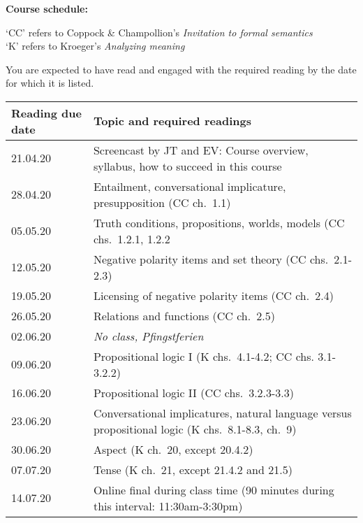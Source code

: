 \documentclass[11pt,fleqn,a4]{article}
\newcommand{\6}{\mbox{$[\hspace*{-.6mm}[$}}
\newcommand{\9}{\mbox{$]\hspace*{-.6mm}]$}}
\begin{document}
{\bf Course schedule:} 

`CC' refers to Coppock \& Champollion's {\em Invitation to formal semantics}
\\
`K' refers to Kroeger's {\em Analyzing meaning}

You are expected to have read and engaged with the required reading by the date for which it is listed.

\begin{longtable}{l l}
{\bf Reading due date} & {\bf Topic and required readings}  \\ \hline

21.04.20 & Screencast by JT and EV: Course overview, syllabus, how to succeed in this course   \\ 

28.04.20 & Entailment, conversational implicature, presupposition (CC ch.\ 1.1) \\

05.05.20 & Truth conditions, propositions, worlds, models (CC chs.\ 1.2.1, 1.2.2 \\

12.05.20 & Negative polarity items and set theory (CC chs.\ 2.1-2.3) \\

19.05.20 & Licensing of negative polarity items (CC ch.\ 2.4) \\

26.05.20 & Relations and functions (CC ch.\ 2.5) \\

02.06.20 & {\em No class, Pfingstferien} \\

09.06.20 & Propositional logic I (K chs.\ 4.1-4.2; CC chs. 3.1-3.2.2)\\

16.06.20 & Propositional logic II (CC chs.\ 3.2.3-3.3) \\

23.06.20 & Conversational implicatures, natural language versus propositional logic (K chs.\ 8.1-8.3, ch.\ 9) \\

30.06.20 & Aspect (K ch.\ 20, except 20.4.2) \\

07.07.20 & Tense (K ch.\ 21, except 21.4.2 and 21.5) \\ 

14.07.20 & Online final during class time (90 minutes during this interval: 11:30am-3:30pm) \\

\hline

\end{longtable}
\end{document}
